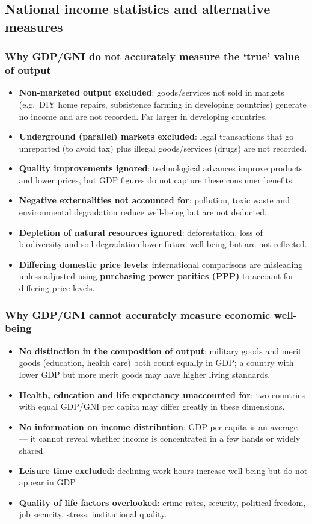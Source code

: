 \subsection{National income statistics and alternative measures}
\subsubsection*{Why GDP/GNI do not accurately measure the `true' value of output}
\begin{itemize}
  \item \textbf{Non-marketed output excluded}: goods/services not sold in markets (e.g.\ DIY home repairs, subsistence farming in developing countries) generate no income and are not recorded. Far larger in developing countries.
  \item \textbf{Underground (parallel) markets excluded}: legal transactions that go unreported (to avoid tax) plus illegal goods/services (drugs) are not recorded.
  \item \textbf{Quality improvements ignored}: technological advances improve products and lower prices, but GDP figures do not capture these consumer benefits.
  \item \textbf{Negative externalities not accounted for}: pollution, toxic waste and environmental degradation reduce well-being but are not deducted.
  \item \textbf{Depletion of natural resources ignored}: deforestation, loss of biodiversity and soil degradation lower future well-being but are not reflected.
  \item \textbf{Differing domestic price levels}: international comparisons are misleading unless adjusted using \textbf{purchasing power parities (PPP)} to account for differing price levels.
\end{itemize}
\subsubsection*{Why GDP/GNI cannot accurately measure economic well-being}
\begin{itemize}
  \item \textbf{No distinction in the composition of output}: military goods and merit goods (education, health care) both count equally in GDP; a country with lower GDP but more merit goods may have higher living standards.
  \item \textbf{Health, education and life expectancy unaccounted for}: two countries with equal GDP/GNI per capita may differ greatly in these dimensions.
  \item \textbf{No information on income distribution}: GDP per capita is an average --- it cannot reveal whether income is concentrated in a few hands or widely shared.
  \item \textbf{Leisure time excluded}: declining work hours increase well-being but do not appear in GDP.
  \item \textbf{Quality of life factors overlooked}: crime rates, security, political freedom, job security, stress, institutional quality.
\end{itemize}

